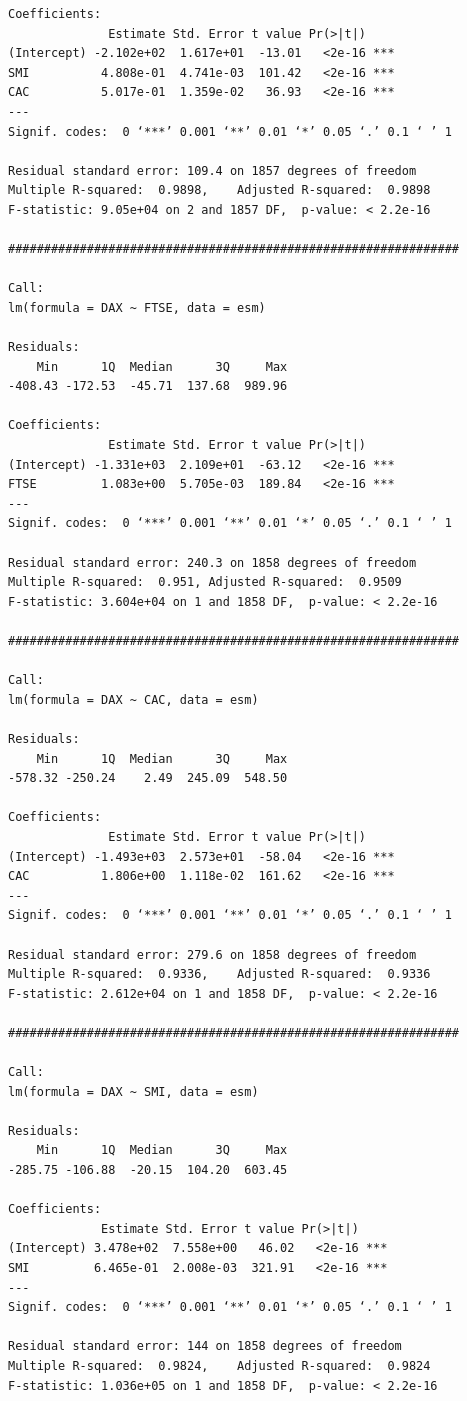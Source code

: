 \documentclass[a4paper, 11pt]{article}
\begin{document}
\begin{verbatim}
Coefficients:
              Estimate Std. Error t value Pr(>|t|)    
(Intercept) -2.102e+02  1.617e+01  -13.01   <2e-16 ***
SMI          4.808e-01  4.741e-03  101.42   <2e-16 ***
CAC          5.017e-01  1.359e-02   36.93   <2e-16 ***
---
Signif. codes:  0 ‘***’ 0.001 ‘**’ 0.01 ‘*’ 0.05 ‘.’ 0.1 ‘ ’ 1

Residual standard error: 109.4 on 1857 degrees of freedom
Multiple R-squared:  0.9898,	Adjusted R-squared:  0.9898 
F-statistic: 9.05e+04 on 2 and 1857 DF,  p-value: < 2.2e-16

###############################################################

Call:
lm(formula = DAX ~ FTSE, data = esm)

Residuals:
    Min      1Q  Median      3Q     Max 
-408.43 -172.53  -45.71  137.68  989.96 

Coefficients:
              Estimate Std. Error t value Pr(>|t|)    
(Intercept) -1.331e+03  2.109e+01  -63.12   <2e-16 ***
FTSE         1.083e+00  5.705e-03  189.84   <2e-16 ***
---
Signif. codes:  0 ‘***’ 0.001 ‘**’ 0.01 ‘*’ 0.05 ‘.’ 0.1 ‘ ’ 1

Residual standard error: 240.3 on 1858 degrees of freedom
Multiple R-squared:  0.951,	Adjusted R-squared:  0.9509 
F-statistic: 3.604e+04 on 1 and 1858 DF,  p-value: < 2.2e-16

###############################################################

Call:
lm(formula = DAX ~ CAC, data = esm)

Residuals:
    Min      1Q  Median      3Q     Max 
-578.32 -250.24    2.49  245.09  548.50 

Coefficients:
              Estimate Std. Error t value Pr(>|t|)    
(Intercept) -1.493e+03  2.573e+01  -58.04   <2e-16 ***
CAC          1.806e+00  1.118e-02  161.62   <2e-16 ***
---
Signif. codes:  0 ‘***’ 0.001 ‘**’ 0.01 ‘*’ 0.05 ‘.’ 0.1 ‘ ’ 1

Residual standard error: 279.6 on 1858 degrees of freedom
Multiple R-squared:  0.9336,	Adjusted R-squared:  0.9336 
F-statistic: 2.612e+04 on 1 and 1858 DF,  p-value: < 2.2e-16

###############################################################

Call:
lm(formula = DAX ~ SMI, data = esm)

Residuals:
    Min      1Q  Median      3Q     Max 
-285.75 -106.88  -20.15  104.20  603.45 

Coefficients:
             Estimate Std. Error t value Pr(>|t|)    
(Intercept) 3.478e+02  7.558e+00   46.02   <2e-16 ***
SMI         6.465e-01  2.008e-03  321.91   <2e-16 ***
---
Signif. codes:  0 ‘***’ 0.001 ‘**’ 0.01 ‘*’ 0.05 ‘.’ 0.1 ‘ ’ 1

Residual standard error: 144 on 1858 degrees of freedom
Multiple R-squared:  0.9824,	Adjusted R-squared:  0.9824 
F-statistic: 1.036e+05 on 1 and 1858 DF,  p-value: < 2.2e-16
\end{verbatim}\label{muchotexto}\endgroup
\end{document}

